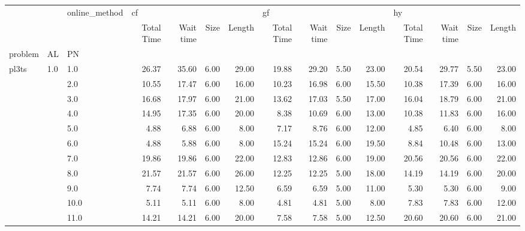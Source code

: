 \begin{tabular}{lllrrrrrrrrrrrr}
\toprule
        &     & online\_method & \multicolumn{4}{l}{cf} & \multicolumn{4}{l}{gf} & \multicolumn{4}{l}{hy} \\
        &     & {} & Total Time & Wait time & Size & Length & Total Time & Wait time & Size & Length & Total Time & Wait time & Size & Length \\
problem & AL & PN &            &           &      &        &            &           &      &        &            &           &      &        \\
\midrule
pl3ts & 1.0 & 1.0  &      26.37 &     35.60 & 6.00 &  29.00 &      19.88 &     29.20 & 5.50 &  23.00 &      20.54 &     29.77 & 5.50 &  23.00 \\
        &     & 2.0  &      10.55 &     17.47 & 6.00 &  16.00 &      10.23 &     16.98 & 6.00 &  15.50 &      10.38 &     17.39 & 6.00 &  16.00 \\
        &     & 3.0  &      16.68 &     17.97 & 6.00 &  21.00 &      13.62 &     17.03 & 5.50 &  17.00 &      16.04 &     18.79 & 6.00 &  21.00 \\
        &     & 4.0  &      14.95 &     17.35 & 6.00 &  20.00 &       8.38 &     10.69 & 6.00 &  13.00 &      10.38 &     11.83 & 6.00 &  16.00 \\
        &     & 5.0  &       4.88 &      6.88 & 6.00 &   8.00 &       7.17 &      8.76 & 6.00 &  12.00 &       4.85 &      6.40 & 6.00 &   8.00 \\
        &     & 6.0  &       4.88 &      5.88 & 6.00 &   8.00 &      15.24 &     15.24 & 6.00 &  19.50 &       8.84 &     10.48 & 6.00 &  13.00 \\
        &     & 7.0  &      19.86 &     19.86 & 6.00 &  22.00 &      12.83 &     12.86 & 6.00 &  19.00 &      20.56 &     20.56 & 6.00 &  22.00 \\
        &     & 8.0  &      21.57 &     21.57 & 6.00 &  26.00 &      12.25 &     12.25 & 5.00 &  18.00 &      14.19 &     14.19 & 6.00 &  20.00 \\
        &     & 9.0  &       7.74 &      7.74 & 6.00 &  12.50 &       6.59 &      6.59 & 5.00 &  11.00 &       5.30 &      5.30 & 6.00 &   9.00 \\
        &     & 10.0 &       5.11 &      5.11 & 6.00 &   8.00 &       4.81 &      4.81 & 5.00 &   8.00 &       7.83 &      7.83 & 6.00 &  12.00 \\
        &     & 11.0 &      14.21 &     14.21 & 6.00 &  20.00 &       7.58 &      7.58 & 5.00 &  12.50 &      20.60 &     20.60 & 6.00 &  21.00 \\

\end{tabular}
